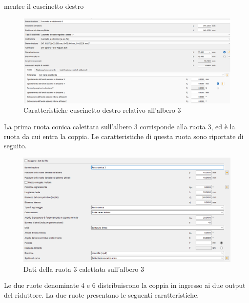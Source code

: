 mentre il cuscinetto destro
\begin{figure}[h]
    \centering
    \includegraphics[scale=0.45]{Immagini/CuscinettoDestraAlbero3.png}
    \caption{Caratteristiche cuscinetto destro relativo all'albero 3}
    \label{fig:CuscinettoDestraAlbero3}
\end{figure}
\newpage
La prima ruota conica calettata sull'albero 3 corrisponde alla ruota 3, ed è la ruota da cui entra la coppia. Le caratteristiche di questa ruota sono riportate di seguito.
\begin{figure}[h]
    \centering
    \includegraphics[scale=0.27]{Immagini/Ruota3Albero3.png}
    \caption{Dati della ruota 3 calettata sull'albero 3}
    \label{fig:Ruota1Albero2}
\end{figure}
\newpage
Le due ruote denominate 4 e 6 distribuiscono la coppia in ingresso ai due output del riduttore. La due ruote presentano le seguenti caratteristiche.
